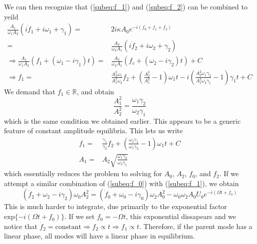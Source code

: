We can then recognize that (\ref{subeq:f_1}) and (\ref{subeq:f_2}) can be combined to yeild
\begin{subequations}
\begin{align}
\frac{A_1}{\omega_1 A_2} (i\dot{f}_1 + i\omega_1 + \gamma_1) = & 2i\kappa A_0 e^{-i(f_0 + f_1 +f_2)}  \\
                                                             = & \frac{A_2}{\omega_2 A_1}(i\dot{f}_2 + i\omega_2 + \gamma_2) \\
\Rightarrow \frac{A_1}{\omega_1 A_2}(f_1 + (\omega_1 - i\gamma_1)t) = & \frac{A_2}{\omega_2 A_1} (f_c + (\omega_2 -i\gamma_2)t) + C \\
\Rightarrow f_1 = & \frac{A_2^2 \omega_1}{A_1^2 \omega_2} f_2 + \left( \frac{A_2^2}{A_1^2} -1 \right)\omega_1 t - i\left(\frac{A_2^2\omega_1\gamma_2}{A_1^2\omega_2\gamma_1} - 1 \right)\gamma_1 t + C
\end{align}
\end{subequations}
We demand that $f_1 \in \mathbb{R}$, and obtain
\begin{equation}
\frac{A_1^2}{A_2^2} = \frac{\omega_1\gamma_2}{\omega_2\gamma_1}
\end{equation}
which is the same condition we obtained earlier. This appears to be a generic feature of constant amplitude equilibria. This lets us write
\begin{subequations}
\begin{align}
f_1 = & \frac{\gamma_1}{\gamma_2} f_2 + \left(\frac{\omega_2\gamma_1}{\omega_1\gamma_2} - 1\right) \omega_1 t + C \\
A_1 = & A_2 \sqrt{\frac{\omega_1\gamma_2}{\omega_2\gamma_1}}
\end{align}
\end{subequations}
which essentially reduces the problem to solving for $A_0$, $A_2$, $f_0$, and $f_2$. If we attempt a similar combination of (\ref{subeq:f_0}) with (\ref{subeq:f_1}), we obtain
\begin{equation}
(\dot{f}_2 + \omega_2 -i\gamma_2)\omega_0 A_2^2 = (\dot{f}_0 + \omega_0 -i\gamma_0)\omega_2 A_0^2 - \omega_0 \omega_2 A_0 U_0 e^{-i(\Omega t + f_0)}
\end{equation}
This is much harder to integrate, due primarily to the exponential factor $\mathrm{exp}\{-i(\Omega t + f_0)\}$. If we set $f_0 = -\Omega t$, this exponential dissapears and we notice that $\dot{f}_2 = \mathrm{constant} \Rightarrow f_2 \propto t \Rightarrow f_1 \propto t$. Therefore, if the parent mode has a linear phase, all modes will have a linear phase in equilibrium.

